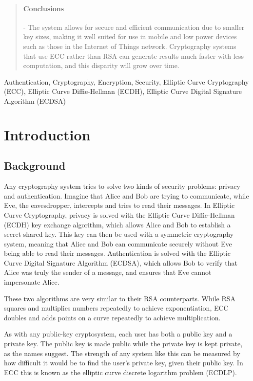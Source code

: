 \documentclass[12pt,a4paper]{article}
\begin{document}
\begin{abstract}
    \vspace{-5mm}
    \paragraph{Conclusions} -
    The system allows for secure and efficient communication due to smaller key sizes, making it well suited for use in mobile and low power devices such as those in the Internet of Things network. 
    Cryptography systems that use ECC rather than RSA can generate results much faster with less computation, and this disparity will grow over time. 

\end{abstract}


\begin{keywords}
Authentication, Cryptography, Encryption, Security, Elliptic Curve Cryptography (ECC), Elliptic Curve Diffie-Hellman (ECDH), 
Elliptic Curve Digital Signature Algorithm (ECDSA)
\end{keywords}


\section{Introduction}

\subsection{Background} \noindent
Any cryptography system tries to solve two kinds of security problems: privacy and authentication. 
Imagine that Alice and Bob are trying to communicate, while Eve, the eavesdropper, intercepts and tries to read their messages. 
In Elliptic Curve Cryptography, privacy is solved with the Elliptic Curve Diffie-Hellman (ECDH) key exchange algorithm, 
which allows Alice and Bob to establish a secret shared key. 
This key can then be used with a symmetric cryptography system, meaning that Alice and Bob can communicate securely without Eve being able to read their messages. 
Authentication is solved with the Elliptic Curve Digital Signature Algorithm (ECDSA), 
which allows Bob to verify that Alice was truly the sender of a message, and ensures that Eve cannot impersonate Alice. 

These two algorithms are very similar to their RSA counterparts. 
While RSA squares and multiplies numbers repeatedly to achieve exponentiation, 
ECC doubles and adds points on a curve repeatedly to achieve multiplication. 

As with any public-key cryptosystem, each user has both a public key and a private key. 
The public key is made public while the private key is kept private, as the names suggest. 
The strength of any system like this can be measured by how difficult it would be to find the user's private key, given their public key. 
In ECC this is known as the elliptic curve discrete logarithm problem (ECDLP). 
\end{document}
